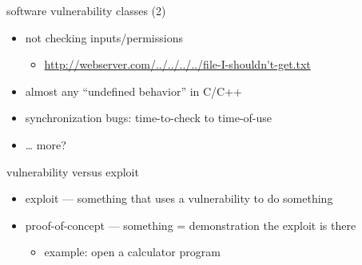 \begin{frame}{software vulnerability classes (2)}
    \begin{itemize}
    \item not checking inputs/permissions
        \begin{itemize}
        \item \url{http://webserver.com/../../../../file-I-shouldn't-get.txt}
        \end{itemize}
    \item almost any ``undefined behavior'' in C/C++
    \item synchronization bugs: time-to-check to time-of-use
    \item \ldots{} more?
    \end{itemize}
\end{frame}

\begin{frame}{vulnerability versus exploit}
    \begin{itemize}
    \item exploit --- something that uses a vulnerability to do something
    \item proof-of-concept --- something = demonstration the exploit is there
        \begin{itemize}
        \item example: open a calculator program
        \end{itemize}
    \end{itemize}
\end{frame}


